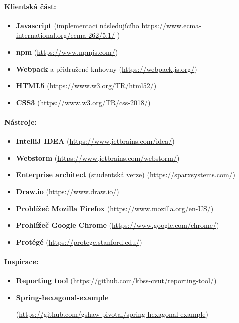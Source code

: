 \paragraph{Klientská část:}
\begin{itemize}
    \item \textbf{Javascript} (implementaci následujícího \url{https://www.ecma-international.org/ecma-262/5.1/} )
    \item \textbf{npm} (\url{https://www.npmjs.com/})
    \item \textbf{Webpack} a přidružené knhovny (\url{https://webpack.js.org/})
    \item \textbf{HTML5} (\url{https://www.w3.org/TR/html52/})
    \item \textbf{CSS3} (\url{https://www.w3.org/TR/css-2018/})
\end{itemize}
\paragraph{Nástroje:}
\begin{itemize}
    \item \textbf{IntelliJ IDEA} (\url{https://www.jetbrains.com/idea/})
    \item \textbf{Webstorm} (\url{https://www.jetbrains.com/webstorm/})
    \item \textbf{Enterprise architect} (studentská verze) (\url{https://sparxsystems.com/})
    \item \textbf{Draw.io} (\url{https://www.draw.io/})
    \item \textbf{Prohlížeč Mozilla Firefox} (\url{https://www.mozilla.org/en-US/})
    \item \textbf{Prohlížeč Google Chrome} (\url{https://www.google.com/chrome/})
    \item \textbf{Protégé} (\url{https://protege.stanford.edu/})
\end{itemize}
\paragraph{Inspirace:}
\begin{itemize}
    \item \textbf{Reporting tool} (\url{https://github.com/kbss-cvut/reporting-tool/})
    \item \textbf{Spring-hexagonal-example}\par (\url{https://github.com/gshaw-pivotal/spring-hexagonal-example})
\end{itemize}

